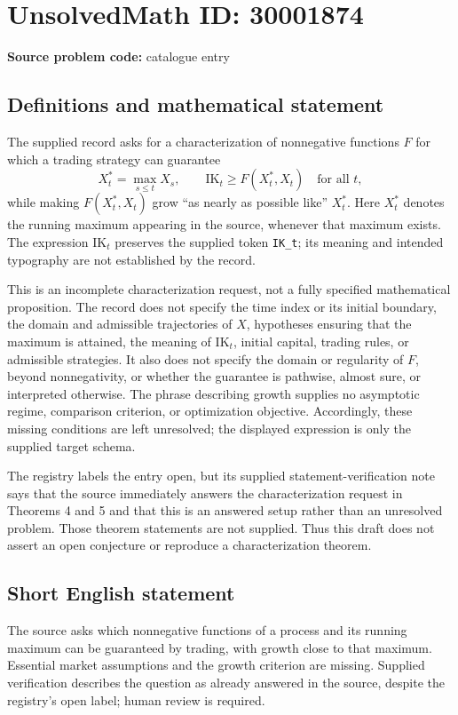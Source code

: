 \documentclass[11pt]{article}
\begin{document}
\section*{UnsolvedMath ID: 30001874}
\textbf{Source problem code:} catalogue entry
\subsection{Definitions and mathematical statement}
The supplied record asks for a characterization of nonnegative functions \(F\) for which a trading strategy can guarantee
\[
X_t^*=\max_{s\le t}X_s,
\qquad
\mathrm{IK}_t\ge F(X_t^*,X_t)
\quad\text{for all }t,
\]
while making \(F(X_t^*,X_t)\) grow ``as nearly as possible like'' \(X_t^*\). Here \(X_t^*\) denotes the running maximum appearing in the source, whenever that maximum exists. The expression \(\mathrm{IK}_t\) preserves the supplied token \texttt{IK\_t}; its meaning and intended typography are not established by the record.

This is an incomplete characterization request, not a fully specified mathematical proposition. The record does not specify the time index or its initial boundary, the domain and admissible trajectories of \(X\), hypotheses ensuring that the maximum is attained, the meaning of \(\mathrm{IK}_t\), initial capital, trading rules, or admissible strategies. It also does not specify the domain or regularity of \(F\), beyond nonnegativity, or whether the guarantee is pathwise, almost sure, or interpreted otherwise. The phrase describing growth supplies no asymptotic regime, comparison criterion, or optimization objective. Accordingly, these missing conditions are left unresolved; the displayed expression is only the supplied target schema.

The registry labels the entry open, but its supplied statement-verification note says that the source immediately answers the characterization request in Theorems 4 and 5 and that this is an answered setup rather than an unresolved problem. Those theorem statements are not supplied. Thus this draft does not assert an open conjecture or reproduce a characterization theorem.
\subsection{Short English statement}
The source asks which nonnegative functions of a process and its running maximum can be guaranteed by trading, with growth close to that maximum. Essential market assumptions and the growth criterion are missing. Supplied verification describes the question as already answered in the source, despite the registry's open label; human review is required.
\end{document}
